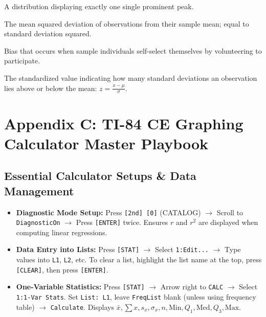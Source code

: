 \begin{description}[leftmargin=1.5em, style=nextline]
  \item[Unimodal] A distribution displaying exactly one single prominent peak.
  \item[Variance ($s^2$)] The mean squared deviation of observations from their sample mean; equal to standard deviation squared.
  \item[Voluntary Response Bias] Bias that occurs when sample individuals self-select themselves by volunteering to participate.
  \item[$z$-Score] The standardized value indicating how many standard deviations an observation lies above or below the mean: $z = \frac{x - \mu}{\sigma}$.
\end{description}

\chapter{Appendix C: TI-84 CE Graphing Calculator Master Playbook}

\section{Essential Calculator Setups \& Data Management}
\begin{itemize}[leftmargin=1.5em]
  \item \textbf{Diagnostic Mode Setup:}
  Press \texttt{[2nd] [0]} (CATALOG) $\to$ Scroll to \texttt{DiagnosticOn} $\to$ Press \texttt{[ENTER]} twice. Ensures $r$ and $r^2$ are displayed when computing linear regressions.
  \item \textbf{Data Entry into Lists:}
  Press \texttt{[STAT]} $\to$ Select \texttt{1:Edit...} $\to$ Type values into \texttt{L1}, \texttt{L2}, etc. To clear a list, highlight the list name at the top, press \texttt{[CLEAR]}, then press \texttt{[ENTER]}.
  \item \textbf{One-Variable Statistics:}
  Press \texttt{[STAT]} $\to$ Arrow right to \texttt{CALC} $\to$ Select \texttt{1:1-Var Stats}. Set \texttt{List: L1}, leave \texttt{FreqList} blank (unless using frequency table) $\to$ \texttt{Calculate}. Displays $\bar{x}, \sum x, s_x, \sigma_x, n, \text{Min}, Q_1, \text{Med}, Q_3, \text{Max}$.
\end{itemize}

